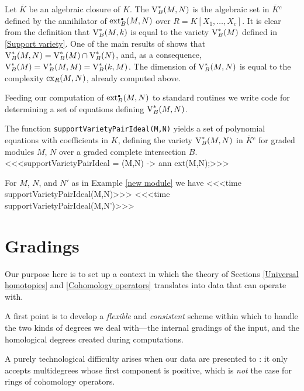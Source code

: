 Let $\overline K$ be an algebraic closure of $K$.  The {\it{}\/} $\operatorname{V}^*_B(M,N)$ is the algebraic set in ${\overline K}{}^c$
defined by the annihilator of $\operatorname{ext}^{\scriptscriptstyle\bullet}_B(M,N)$ over
$R=K[X_1,\dots,X_c]$.  It is clear from the definition that
$\operatorname{V}^*_B(M,k)$ is equal to the variety $\operatorname{V}^*_B(M)$ defined in
\ref{Support variety}.  One of the main results of
\cite[Sect.~5]{CI:AB2} shows that $\operatorname{V}^*_B(M,N)=\operatorname{V}^*_B(M)\cap
\operatorname{V}^*_B(N)$, and, as a consequence, $\operatorname{V}^*_B(M)=\operatorname{V}^*_B(M,M)=
\operatorname{V}^*_B(k,M)$.  The dimension of $\operatorname{V}^*_B(M,N)$ is equal to the
complexity $\operatorname{cx}_R(M,N)$, already computed above.

Feeding our computation of $\operatorname{ext}^{\scriptscriptstyle\bullet}_B(M,N)$ to standard \Mtwo
routines we write code for determining a set of equations defining
$\operatorname{V}^*_B(M,N)$.

\begin{sCode}
The function {\tt supportVarietyPairIdeal(M,N)} yields a set of polynomial
equations with coefficients in $K$, defining the variety
$\operatorname{V}^*_B(M,N)$ in ${\overline K}{}^c$ for graded modules $M$, $N$ over
a graded complete intersection $B$.
<<<supportVarietyPairIdeal = (M,N) -> ann ext(M,N);>>>
 \end{sCode}

\begin{sExample}
For $M$, $N$, and $N'$ as in Example \ref{new module} we have
<<<time supportVarietyPairIdeal(M,N)>>>
<<<time supportVarietyPairIdeal(M,N')>>>
\end{sExample}

\appendix

\section{Gradings}
\label{Gradings}

Our purpose here is to set up a context in which the theory of Sections
\ref{Universal homotopies} and \ref{Cohomology operators} translates
into data that \Mtwo can operate with.

A first point is to develop a {\it flexible\/} and {\it consistent\/}
scheme within which to handle the two kinds of degrees we deal
with---the internal gradings of the input, and the homological degrees
created during computations.

A purely technological difficulty arises when our data are presented to
\Mtwo: it only accepts multidegrees whose first component is positive,
which is {\it not\/} the case for rings of cohomology operators.

